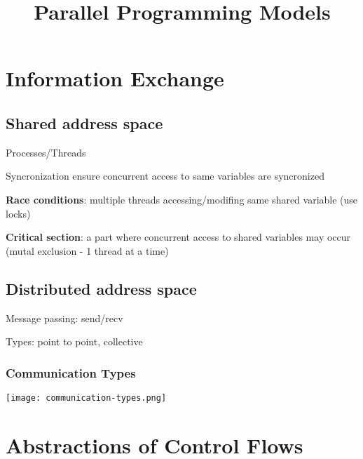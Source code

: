 \documentclass[12pt]{article}
\title{\textbf{Parallel Programming Models}}
\date{}
\begin{document}
\maketitle

\begin{spacing}{1.5}

\section{Information Exchange}

\subsection{Shared address space}

\begin{itemize*}
	\item Processes/Threads
	\item Syncronization ensure concurrent access to same variables are syncronized
	\item \textbf{Race conditions}: multiple threads accessing/modifing same shared variable (use locks)
	\item \textbf{Critical section}: a part where concurrent access to shared variables may occur (mutal exclusion - 1 thread at a time)
\end{itemize*}

\subsection{Distributed address space}

\begin{itemize*}
	\item Message passing: send/recv
	\item Types: point to point, collective
\end{itemize*}

\subsubsection{Communication Types}

\texttt{[image: communication-types.png]}

\section{Abstractions of Control Flows}

\begin{tabular}{l | p{6cm} p{6cm}}


\end{tabular}
\end{spacing}
\end{document}
